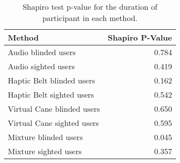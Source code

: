 
\begin{table}[!htb]
\centering
\caption{Shapiro test p-value for the duration of participant in each method.}
\label{tab:shapiro_duration}
\begin{tabular}{lr}
\toprule
                    Method &  Shapiro P-Value \\
\midrule
       Audio blinded users &            0.784 \\
       Audio sighted users &            0.419 \\
 Haptic Belt blinded users &            0.162 \\
 Haptic Belt sighted users &            0.542 \\
Virtual Cane blinded users &            0.650 \\
Virtual Cane sighted users &            0.595 \\
     Mixture blinded users &            0.045 \\
     Mixture sighted users &            0.357 \\
\bottomrule
\end{tabular}
\end{table}

